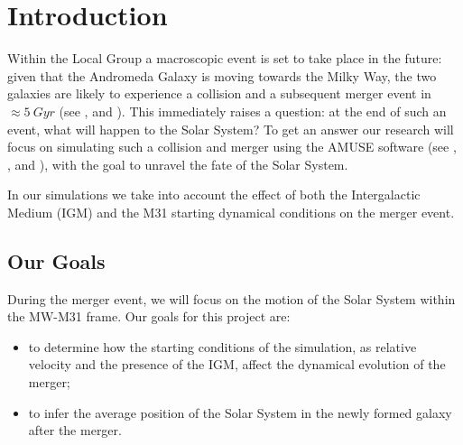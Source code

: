 \documentclass[a4paper,12pt, english]{article}
\begin{document}
\newpage

\tableofcontents 

\newpage 

\section{Introduction}
\label{introduction}
Within the Local Group a macroscopic event is set to take place in the future: given that the Andromeda Galaxy is moving towards the Milky Way, the two galaxies are likely to experience a collision and a subsequent merger event in \(\approx 5\: Gyr\) (see \textcite{Cox_2008}, \textcite{van_der_Marel_2019} and \textcite{Schiavi_2019}). This immediately raises a question: at the end of such an event, what will happen to the Solar System? To get an answer our research will focus on simulating such a collision and merger using the AMUSE software (see \textcite{Portegies_Zwart_McMillan_2018}, \textcite{Portegies_Zwart_2013}, \textcite{Pelupessy_2013} and \textcite{Portegies_Zwart_2009}), with the goal to unravel the fate of the Solar System.\par
\smallskip
In our simulations we take into account the effect of both the Intergalactic Medium (IGM) and the M31 starting dynamical conditions on the merger event.\par
\smallskip

\subsection{Our Goals}
\label{goals}
During the merger event, we will focus on the motion of the Solar System within the MW-M31 frame. Our goals for this project are: 
\begin{itemize}
    \item to determine how the starting conditions of the simulation, as relative velocity and the presence of the IGM, affect the dynamical evolution of the merger;
    \item to infer the average position of the Solar System in the newly formed galaxy after the merger.
\end{itemize}
\par\smallskip
\end{document}
